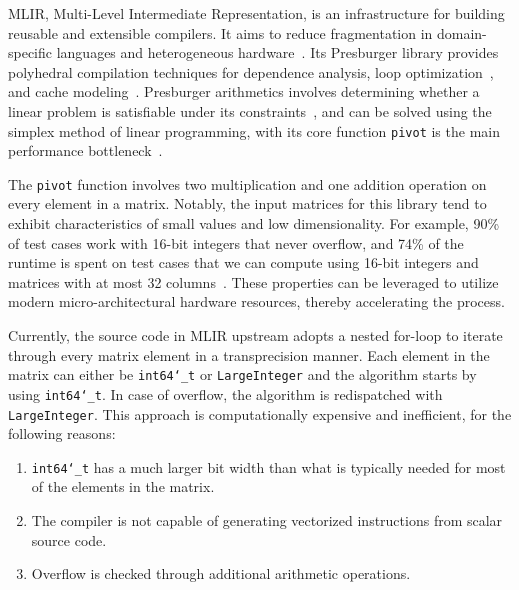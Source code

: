 \documentclass[logo,bsc,singlespacing,parskip]{infthesis}
\newcommand{\dtlong}{\texttt{int64\char`_t}}
\newcommand{\pivot}{\texttt{pivot}}
\begin{document}
MLIR, Multi-Level Intermediate Representation, is an infrastructure for building
reusable and extensible compilers. It aims to reduce fragmentation in domain-specific
languages and heterogeneous hardware~\cite{mlir}. Its Presburger
library provides polyhedral compilation techniques for dependence analysis,
loop optimization~\cite{mliraffine}, and cache modeling~\cite{CacheModel}.
Presburger arithmetics involves determining whether a linear problem is 
satisfiable under its constraints~\cite{SMLPPA}, and can be solved using the
simplex method of linear programming, with its core function \pivot{} is the
main performance bottleneck~\cite{FPL1}. 


The \texttt{pivot} function involves two multiplication and one addition
operation on every element in a matrix. Notably, the input matrices for this
library tend to exhibit characteristics of small values and low dimensionality.
For example, 90\% of test cases work with 16-bit integers that never overflow,
and 74\% of the runtime is spent on test cases that we can compute using
16-bit integers and matrices with at most 32 columns~\cite{FPL2}. These
properties can be leveraged to utilize modern micro-architectural
hardware resources, thereby accelerating the process.

Currently, the source code in MLIR upstream adopts a nested for-loop to iterate
through every matrix element in a transprecision manner. Each element in the
matrix can either be \dtlong{} or \texttt{LargeInteger} and the algorithm starts
by using \dtlong{}. In case of overflow, the algorithm is redispatched with
\texttt{LargeInteger}. This approach is computationally expensive and
inefficient, for the following reasons: 
\begin{enumerate}

\item \dtlong{} has a much larger bit width than what is typically
needed for most of the elements in the matrix.

\item The compiler is not capable of generating vectorized instructions from
scalar source code.

\item Overflow is checked through additional arithmetic
operations.

\end{enumerate}
\end{document}
